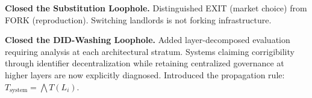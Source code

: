 \documentclass{article}
\begin{document}
\begin{description}[style=nextline, leftmargin=1em, labelindent=0pt]
\item[\textbf{Version 1.6.2 (Reproduction)}]
\textbf{Closed the Substitution Loophole.} Distinguished EXIT (market choice) from FORK (reproduction). Switching landlords is not forking infrastructure.

\item[\textbf{Version 1.7 (Layering)}]
\textbf{Closed the DID-Washing Loophole.} Added layer-decomposed evaluation requiring analysis at each architectural stratum. Systems claiming corrigibility through identifier decentralization while retaining centralized governance at higher layers are now explicitly diagnosed. Introduced the propagation rule: $T_{\text{system}} = \bigwedge T(L_i)$.

\end{description}


\end{document}

